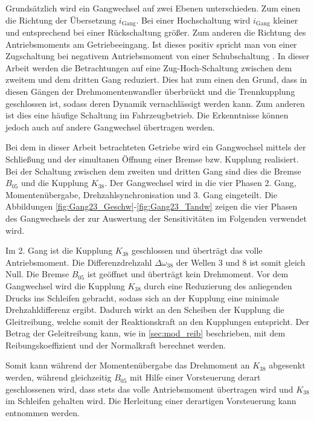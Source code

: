 Grundsätzlich wird ein Gangwechsel auf zwei Ebenen unterschieden. Zum einen die Richtung der Übersetzung $i_\mathrm{Gang}$. Bei einer Hochschaltung wird $i_\mathrm{Gang}$ kleiner und entsprechend bei einer Rückschaltung größer. Zum anderen die Richtung des Antriebsmoments am Getriebeeingang. Ist dieses positiv spricht man von einer Zugschaltung bei negativem Antriebsmoment von einer Schubschaltung \cite{Fischer.2016}.
In dieser Arbeit werden die Betrachtungen auf eine Zug-Hoch-Schaltung zwischen dem zweitem und dem dritten Gang reduziert. Dies hat zum einen den Grund, dass in diesen Gängen der Drehmomentenwandler überbrückt und die Trennkupplung geschlossen ist, sodass deren Dynamik vernachlässigt werden kann. Zum anderen ist dies eine häufige Schaltung im Fahrzeugbetrieb. Die Erkenntnisse können jedoch auch auf andere Gangwechsel übertragen werden.

Bei dem in dieser Arbeit betrachteten Getriebe wird ein Gangwechsel mittels der Schließung und der simultanen Öffnung einer Bremse bzw. Kupplung realisiert. Bei der Schaltung zwischen dem zweiten und dritten Gang sind dies die Bremse $B_\mathrm{05}$ und die Kupplung $K_\mathrm{38}$. Der Gangwechsel wird in die vier Phasen 2. Gang, Momentenübergabe, Drehzahlsynchronisation und 3. Gang eingeteilt. Die Abbildungen \ref{fig:Gang23_Geschw}-\ref{fig:Gang23_Tandw} zeigen die vier Phasen des Gangwechsels der zur Auswertung der Sensitivitäten im Folgenden verwendet wird.

Im 2. Gang ist die Kupplung $K_\mathrm{38}$ geschlossen und überträgt das volle Antriebsmoment. Die Differenzdrehzahl $\Delta \omega_{38}$ der Wellen 3 und 8 ist somit gleich Null. Die Bremse $B_\mathrm{05}$ ist geöffnet und überträgt kein Drehmoment. Vor dem Gangwechsel wird die Kupplung $K_\mathrm{38}$ durch eine Reduzierung des anliegenden Drucks ins Schleifen gebracht, sodass sich an der Kupplung eine minimale Drehzahldifferenz ergibt. Dadurch wirkt an den Scheiben der Kupplung die Gleitreibung, welche somit der Reaktionskraft an den Kupplungen entspricht. Der Betrag der Geleitreibung kann, wie in \ref{sec:mod_reib} beschrieben, mit dem Reibungskoeffizient und der Normalkraft berechnet werden.

Somit kann während der Momentenübergabe das Drehmoment an $K_\mathrm{38}$ abgesenkt werden, während gleichzeitig $B_\mathrm{05}$ mit Hilfe einer Vorsteuerung derart geschlossenen wird, dass stets das volle Antriebsmoment übertragen wird und $K_\mathrm{38}$ im Schleifen gehalten wird. Die Herleitung einer derartigen Vorsteuerung kann \cite{Weber.2018} entnommen werden.    
  
